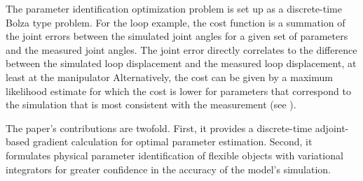 \documentclass[letterpaper, 10pt, conference]{ieeeconf}
\begin{document}




The parameter identification optimization problem is set up as a discrete-time Bolza type problem.  For the loop example, the cost function is a summation of the joint errors between the simulated joint angles for a given set of parameters and the measured joint angles.  The joint error directly correlates to the difference between the simulated loop displacement and the measured loop displacement, at least at the manipulator   Alternatively, the cost can be given by a maximum likelihood estimate for which the cost is lower for parameters that correspond to the simulation that is most consistent with the measurement (see \cite{houska_etal}).  

The paper's contributions are twofold.  First, it provides a discrete-time adjoint-based gradient calculation for optimal parameter estimation.  Second, it formulates physical parameter identification of flexible objects with variational integrators for greater confidence in the accuracy of the model's simulation.
\end{document}
